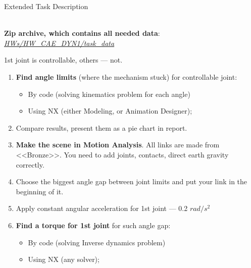 \documentclass[aspectratio=169]{beamer}
\begin{document}
\begin{frame}[t]{Extended Task Description}
\framesubtitle{}
\vspace{-0.6cm}
    \begin{columns}[T,onlytextwidth]
        \begin{column}{0.59\textwidth}
            \scriptsize
    \textbf{Zip archive, which contains all needed data}: \href{https://github.com/Lupasic/MaM_Inno_2023/tree/main/HWs/HW_CAE_DYN1/task_data}{\textit{HWs/HW\_CAE\_DYN1/task\_data}}
    
    1st joint is controllable, others --- not.
    \vspace{-0.1cm}
    \begin{enumerate}
        \item \textbf{Find angle limits} (where the mechanism stuck) for controllable joint:
        \vspace{-0.45cm}

        \begin{itemize}
            \scriptsize
            \item By code (solving kinematics problem for each angle)
            \item Using NX (either Modeling, or Animation Designer);
        \end{itemize}
        \vspace{-0.2cm}

        \item Compare results, present them as a pie chart in report.
        \item \textbf{Make the scene in Motion Analysis}. All links are made from <<Bronze>>. You need to add joints, contacts, direct earth gravity correctly.
        \item Choose the biggest angle gap between joint limits and put your link in the beginning of it.
        \item Apply constant angular acceleration for 1st joint --- 0.2 $rad / s^2$
        \item \textbf{Find a torque for 1st joint} for such angle gap:
        \vspace{-0.1cm}

        \begin{itemize}
            \scriptsize
            \item By code (solving Inverse dynamics problem)
            \item Using NX (any solver);
        \end{itemize}
        \vspace{-0.2cm}


\end{enumerate}
\end{column}
\end{columns}
\end{frame}
\end{document}
